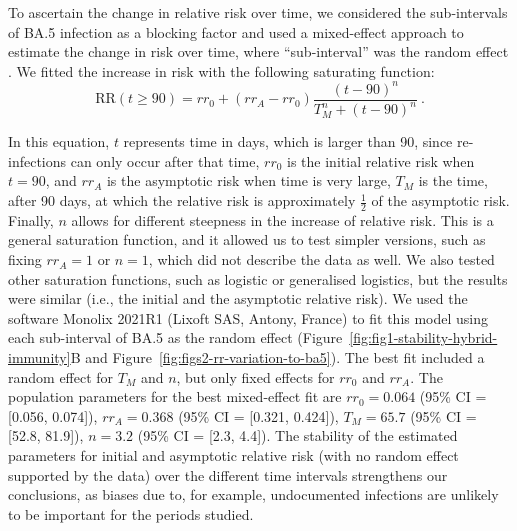 To ascertain the change in relative risk over time, we considered the sub-intervals of BA.5 infection as a blocking factor and used a mixed-effect approach to estimate the change in risk over time, where ``sub-interval'' was the random effect \citep{pinheiro2000MixedEffectsModels}. We fitted the increase in risk with the following saturating function:
% 
\begin{equation}
    \text{RR}(t \geq 90) = rr_0 + (rr_A - rr_0) \frac{(t-90)^n}{T_M^n + (t-90)^n}\ .
    \label{eq:omicron-infection-risk}
\end{equation}

In this equation, $t$ represents time in days, which is larger than 90, since re-infections can only occur after that time, $rr_0$ is the initial relative risk when $t = 90$, and $rr_A$ is the asymptotic risk when time is very large, $T_M$ is the time, after 90 days, at which the relative risk is approximately \(\frac{1}{2}\) of the asymptotic risk. Finally, $n$ allows for different steepness in the increase of relative risk. This is a general saturation function, and it allowed us to test simpler versions, such as fixing $rr_A = 1$ or $n = 1$, which did not describe the data as well. We also tested other saturation functions, such as logistic or generalised logistics, but the results were similar (i.e., the initial and the asymptotic relative risk). We used the software Monolix 2021R1 (Lixoft SAS, Antony, France) to fit this model using each sub-interval of BA.5 as the random effect (Figure~\ref{fig:fig1-stability-hybrid-immunity}B and Figure~\ref{fig:figs2-rr-variation-to-ba5}). The best fit included a random effect for $T_M$ and $n$, but only fixed effects for $rr_0$ and $rr_A$. The population parameters for the best mixed-effect fit are $rr_0 = 0.064$ (95\% CI = [0.056, 0.074]), $rr_A = 0.368$ (95\% CI = [0.321, 0.424]), $T_M = 65.7$ (95\% CI = [52.8, 81.9]), $n = 3.2$ (95\% CI = [2.3, 4.4]). The stability of the estimated parameters for initial and asymptotic relative risk (with no random effect supported by the data) over the different time intervals strengthens our conclusions, as biases due to, for example, undocumented infections are unlikely to be important for the periods studied.

